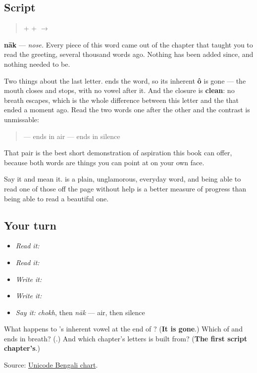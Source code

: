 \subsection*{Script}
\begin{quote}
\textbf{} + \textbf{} + \textbf{} $\to$ \textbf{}
\end{quote}

\textbf{nāk} — \emph{nose.} Every piece of this word came out of the chapter that taught you to read the greeting, several thousand words ago. Nothing has been added since, and nothing needed to be.

Two things about the last letter. \textbf{} ends the word, so its inherent \textbf{ô} is gone — the mouth closes and stops, with no vowel after it. And the closure is \textbf{clean}: no breath escapes, which is the whole difference between this letter and the \textbf{} that ended \textbf{} a moment ago. Read the two words one after the other and the contrast is unmissable:

\begin{quote}
\textbf{} — ends in air \textbf{} — ends in silence
\end{quote}

That pair is the best short demonstration of aspiration this book can offer, because both words are things you can point at on your own face.

Say it and mean it. \textbf{} is a plain, unglamorous, everyday word, and being able to read one of those off the page without help is a better measure of progress than being able to read a beautiful one.

\subsection*{Your turn}
\begin{itemize}
\raggedright
  \item \emph{Read it:} 
  \item \emph{Read it:}  
  \item \emph{Write it:} 
  \item \emph{Write it:}   
  \item \emph{Say it:} \emph{chokh}, then \emph{nāk} — air, then silence
\end{itemize}

\begin{tcolorbox}[breakable,colback=teal!4,colframe=teal!35!black,title={Before you move on}]
What happens to \textbf{}'s inherent vowel at the end of \textbf{}? (\textbf{It is gone}.) Which of \textbf{} and \textbf{} ends in breath? (\textbf{}.) And which chapter's letters is \textbf{} built from? (\textbf{The first script chapter's}.)

Source: \href{https://www.unicode.org/charts/PDF/U0980.pdf}{Unicode Bengali chart}.
\end{tcolorbox}
